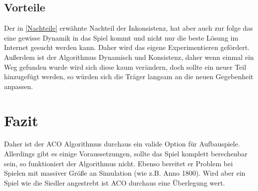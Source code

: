 \documentclass[12pt]{article}
\begin{document}
\subsection{Vorteile}
Der in \ref{Nachteile} erwähnte Nachteil der Inkonsistenz, hat aber auch zur folge das eine gewisse Dynamik in das Spiel kommt und nicht nur die beste Lösung im Internet gesucht werden kann. Daher wird das eigene Experimentieren gefördert.
Außerdem ist der Algorithmus Dynamisch und Konsistenz, daher wenn einmal ein Weg gefunden wurde wird sich diese kaum verändern, doch sollte ein neuer Teil hinzugefügt werden, so würden sich die Träger langsam an die neuen Gegebenheit anpassen.
\section{Fazit}
Daher ist der ACO Algorithmus durchaus ein valide Option für Aufbauspiele. Allerdings gibt es einige Voraussetzungen, sollte das Spiel komplett berechenbar sein, so funktioniert der Algorithmus nicht. Ebenso bereitet er Problem bei Spielen mit massiver Größe an Simulation (wie z.B. Anno 1800).
Wird aber ein Spiel wie die Siedler angestrebt ist ACO durchaus eine Überlegung wert.

\nocite{*}
\printbibliography
\end{document}
